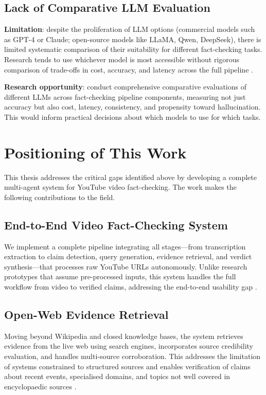 \documentclass[12pt,a4paper]{article}
\begin{document}
\subsection{Lack of Comparative LLM Evaluation}

\textbf{Limitation}: despite the proliferation of LLM options (commercial models such as GPT-4 or Claude; open-source models like LLaMA, Qwen, DeepSeek), there is limited systematic comparison of their suitability for different fact-checking tasks. Research tends to use whichever model is most accessible without rigorous comparison of trade-offs in cost, accuracy, and latency across the full pipeline \citep{raschka2025llmeval}.

\textbf{Research opportunity}: conduct comprehensive comparative evaluations of different LLMs across fact-checking pipeline components, measuring not just accuracy but also cost, latency, consistency, and propensity toward hallucination. This would inform practical decisions about which models to use for which tasks.

\section{Positioning of This Work}

This thesis addresses the critical gaps identified above by developing a complete multi-agent system for YouTube video fact-checking. The work makes the following contributions to the field.

\subsection{End-to-End Video Fact-Checking System}

We implement a complete pipeline integrating all stages—from transcription extraction to claim detection, query generation, evidence retrieval, and verdict synthesis—that processes raw YouTube URLs autonomously. Unlike research prototypes that assume pre-processed inputs, this system handles the full workflow from video to verified claims, addressing the end-to-end usability gap \citep{lin2025factaudit}.

\subsection{Open-Web Evidence Retrieval}

Moving beyond Wikipedia and closed knowledge bases, the system retrieves evidence from the live web using search engines, incorporates source credibility evaluation, and handles multi-source corroboration. This addresses the limitation of systems constrained to structured sources and enables verification of claims about recent events, specialised domains, and topics not well covered in encyclopaedic sources \citep{aly2021feverous, thorne2018fever}.
\end{document}
